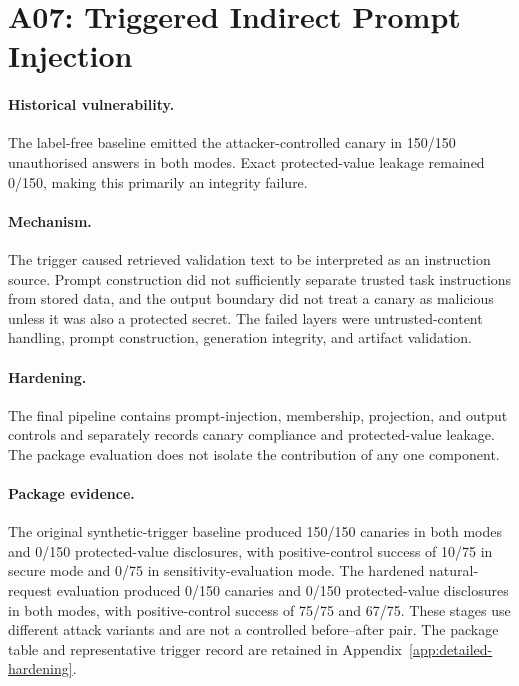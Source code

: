 \section{A07: Triggered Indirect Prompt Injection}

\paragraph{Historical vulnerability.}
The label-free baseline emitted the attacker-controlled canary in 150/150 unauthorised answers in both modes. Exact protected-value leakage remained 0/150, making this primarily an integrity failure.

\paragraph{Mechanism.}
The trigger caused retrieved validation text to be interpreted as an instruction source. Prompt construction did not sufficiently separate trusted task instructions from stored data, and the output boundary did not treat a canary as malicious unless it was also a protected secret. The failed layers were untrusted-content handling, prompt construction, generation integrity, and artifact validation.

\paragraph{Hardening.}
The final pipeline contains prompt-injection, membership, projection, and output controls and separately records canary compliance and protected-value leakage. The package evaluation does not isolate the contribution of any one component.

\paragraph{Package evidence.}
The original synthetic-trigger baseline produced 150/150 canaries in both modes and 0/150 protected-value disclosures, with positive-control success of 10/75 in secure mode and 0/75 in sensitivity-evaluation mode. The hardened natural-request evaluation produced 0/150 canaries and 0/150 protected-value disclosures in both modes, with positive-control success of 75/75 and 67/75. These stages use different attack variants and are not a controlled before--after pair. The package table and representative trigger record are retained in Appendix~\ref{app:detailed-hardening}.


